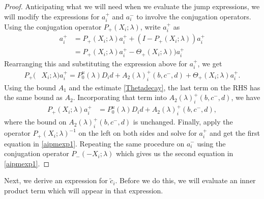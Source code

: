 \documentclass[thesis.tex]{subfiles}
\begin{document}
\begin{lemma}
\begin{proof}
Anticipating what we will need when we evaluate the jump expressions, we will modify the expressions for $a_i^+$ and $a_i^-$ to involve the conjugation operators. Using the conjugation operator $P_+(X_i; \lambda)$, write $a_i^+$ as
\begin{align*}
a_i^+ &= P_+(X_i; \lambda)a_i^+ + (I - P_+(X_i; \lambda))a_i^+ \\
&= P_+(X_i; \lambda)a_i^+ - \Theta_+(X_i; \lambda))a_i^+
\end{align*}
Rearranging this and substituting the expression above for $a_i^+$, we get
\begin{align*}
P_+(&X_i; \lambda) a_i^+ = P_0^u(\lambda) D_i d + A_2(\lambda)_i^+(b, c^-, d) + \Theta_+(X_i; \lambda)a_i^+.
\end{align*}
Using the bound $A_1$ and the estimate \eqref{Thetadecay}, the last term on the RHS has the same bound as $A_2$. Incorporating that term into $A_2(\lambda)_i^+(b, c^-, d)$, we have
\begin{align*}
P_+(X_i; \lambda)a_i^+ &= P_0^u(\lambda) D_i d + A_2(\lambda)_i^+(b, c^-, d),
\end{align*}
where the bound on $A_2(\lambda)_i^+(b, c^-, d)$ is unchanged. Finally, apply the operator $P_+(X_i; \lambda)^{-1}$ on the left on both sides and solve for $a_i^+$ and get the first equation in \cref{aipmexp1}. Repeating the same procedure on $a_i^-$ using the conjugation operator $P_-(-X_i; \lambda)$ which gives us the second equation in \cref{aipmexp1}.
\end{proof}
\end{lemma}

Next, we derive an expression for $\tilde{c}_i$. Before we do this, we will evaluate an inner product term which will appear in that expression.
\end{document}
